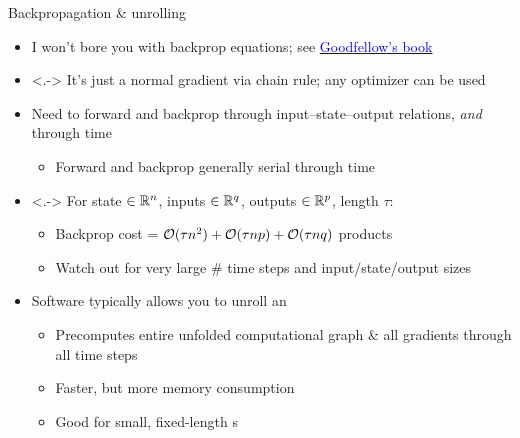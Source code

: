 \begin{frame}{Backpropagation \& unrolling}
    \begin{itemize}
        \item<+-> I won't bore you with backprop equations; see \href{http://www.deeplearningbook.org}{\textcolor{blue}{Goodfellow's book}}
        \item<.-> It's just a normal gradient via chain rule; any optimizer can be used
        \item<+-> Need to forward and backprop through input--state--output relations, \emph{and} through time
        \begin{itemize}
            \item Forward and backprop generally serial through time
        \end{itemize}
        \item<.-> For state $\in \mathbb{R}^n$, inputs $\in \mathbb{R}^q$, outputs $\in \mathbb{R}^p$, length $\tau$:
        \begin{itemize}
            \item Backprop cost = $\mathcal{O}(\tau n^2) + \mathcal{O}(\tau n p) + \mathcal{O}(\tau n q)$ products
            \item Watch out for very large \# time steps and input/state/output sizes
        \end{itemize}
        \item<+-> Software typically allows you to \alert{unroll} an \rnn{}
        \begin{itemize}
            \item Precomputes entire unfolded computational graph \& all gradients through all time steps
            \item Faster, but more memory consumption
            \item Good for small, fixed-length \rnn{}s
        \end{itemize}
    \end{itemize}
\end{frame}

